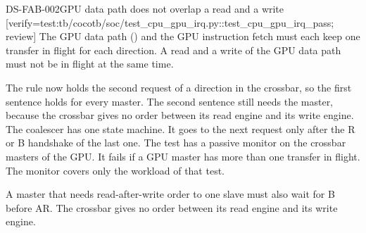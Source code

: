 \begin{requirement}{DS-FAB-002}{GPU data path does not overlap a read and a write}
[verify={test:tb/cocotb/soc/test_cpu_gpu_irq.py::test_cpu_gpu_irq_pass; review}]
The GPU data path () and the GPU instruction fetch must each keep one transfer in flight for each direction. A read and a write of the GPU data path must not be in flight at the same time.
\end{requirement}
\begin{information}
The rule  now holds the second request of a direction in the crossbar, so the first sentence holds for every master. The second sentence still needs the master, because the crossbar gives no order between its read engine and its write engine. The coalescer has one state machine. It goes to the next request only after the R or B handshake of the last one. The test  has a passive monitor on the crossbar masters of the GPU. It fails if a GPU master has more than one transfer in flight. The monitor covers only the workload of that test.
\end{information}

A master that needs read-after-write order to one slave must also wait for B before AR. The crossbar gives no order between its read engine and its write engine.

